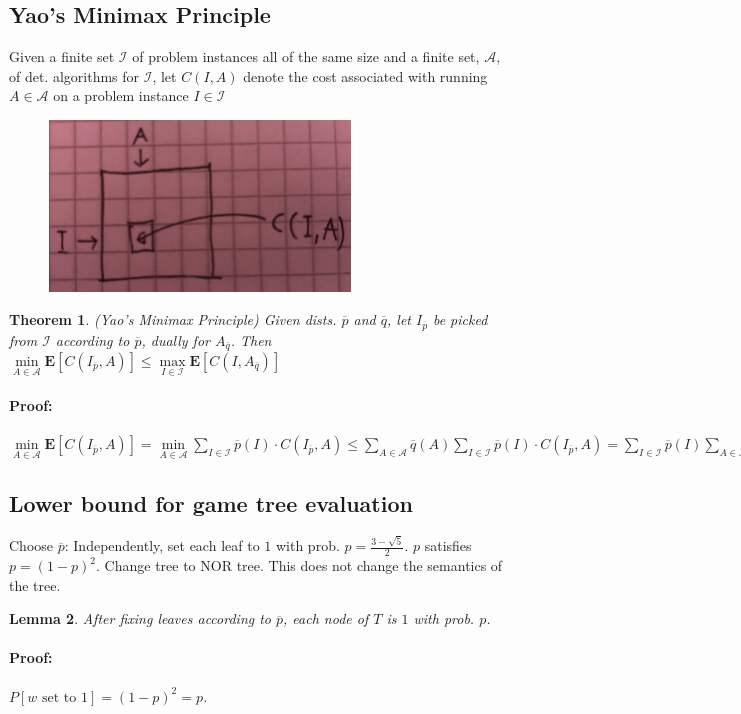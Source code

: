 \documentclass[12pt]{article}
\newtheorem{thm}{Theorem}[section]
\newtheorem{lem}[thm]{Lemma}
\begin{document}
\subsection*{Yao's Minimax Principle}
Given a finite set $\mathcal{I}$ of problem instances all of the same size and a finite set, $\mathcal{A}$, of det. algorithms for $\mathcal{I}$, let $C(I,A)$ denote the cost associated with running $A \in \mathcal{A}$ on a problem instance $I \in \mathcal{I}$
\begin{figure}[!ht]
\includegraphics[width=8cm]{img/payoffmatrix}
\centering
\end{figure}
\begin{thm}
(Yao's Minimax Principle) Given dists. $\overline{p}$ and $\overline{q}$, let $I_{\overline{p}}$ be picked from $\mathcal{I}$ according to $\overline{p}$, dually for $A_{\overline{q}}$. Then $\min\limits_{A \in \mathcal{A}} \mathbf{E}\left[ C(I_{\overline{p}}, A) \right] \leq \max\limits_{I \in \mathcal{I}} \mathbf{E} \left[ C(I, A_{\overline{q}}) \right]$
\paragraph{Proof:} $\min\limits_{A \in \mathcal{A}} \mathbf{E}\left[ C(I_{\overline{p}}, A) \right] = \min\limits_{A \in \mathcal{A}}\limits \sum\limits_{I \in \mathcal{I}} \overline{p}(I) \cdot C(I_{\overline{p}}, A) \leq \sum\limits_{A \in \mathcal{A}} \overline{q}(A) \sum\limits_{I \in \mathcal{I}} \overline{p}(I) \cdot C(I_{\overline{p}}, A) = \sum\limits_{I \in \mathcal{I}} \overline{p}(I) \sum\limits_{A \in \mathcal{A}} \overline{q}(A) \cdot C(I_{\overline{p}}, A) \leq \max\limits_{I \in \mathcal{I}} \mathbf{E} \left[ C(I, A_{\overline{q}}) \right]$
\end{thm}

\subsection*{Lower bound for game tree evaluation}
Choose $\overline{p}$: Independently, set each leaf to $1$ with prob. $p=\frac{3-\sqrt{5}}{2}$. $p$ satisfies $p=(1-p)^2$. Change tree to NOR tree. This does not change the semantics of the tree. \\
\begin{lem}
After fixing leaves according to $\overline{p}$, each node of $T$ is $1$ with prob. $p$.
\paragraph{Proof:} $P[w\text{ set to } 1] = (1-p)^2 = p$.
\end{lem}
\end{document}
